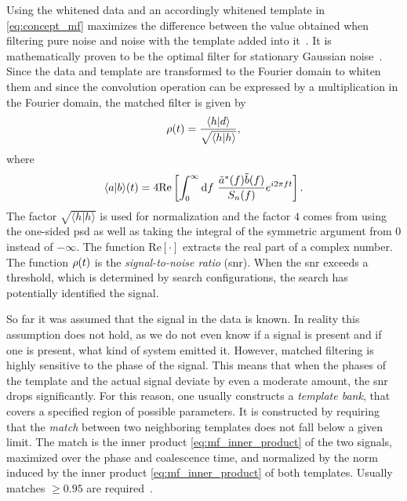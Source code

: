 Using the whitened data and an accordingly whitened template in \eqref{eq:concept_mf} maximizes the difference between the value obtained when filtering pure noise and noise with the template added into it~\cite{Maggiore:2008aaa}. It is mathematically proven to be the optimal filter for stationary Gaussian noise~\cite{Allen:2005fk}. Since the data and template are transformed to the Fourier domain to whiten them and since the convolution operation can be expressed by a multiplication in the Fourier domain, the matched filter is given by~\cite{Maggiore:2008aaa, Usman:2015kfa}%
\begin{equation}
\rho{\left( t \right)} = \frac{\langle h\vert d\rangle}{\sqrt{\langle h\vert h\rangle}},
\end{equation}
where
\begin{equation}\label{eq:mf_inner_product}
\langle a\vert b\rangle\lr{t} = 4\text{Re}\left[\int_0^\infty\diff{f}\ \frac{\tilde{a}^\ast\lr{f}\tilde{b}\lr{f}}{S_n\lr{f}} e^{i2\pi ft}\right].
\end{equation}
The factor $\sqrt{\langle h\vert h\rangle}$ is used for normalization and the factor $4$ comes from using the one-sided \acrshort{psd} as well as taking the integral of the symmetric argument from $0$ instead of $-\infty$. The function $\text{Re}\left[\cdot\right]$ extracts the real part of a complex number. The function $\rho{\left( t \right)}$ is the \emph{signal-to-noise ratio} (\acrshort{snr}). When the \acrshort{snr} exceeds a threshold, which is determined by search configurations, the search has potentially identified the signal.

So far it was assumed that the signal in the data is known. In reality this assumption does not hold, as we do not even know if a signal is present and if one is present, what kind of system emitted it. However, matched filtering is highly sensitive to the phase of the signal. This means that when the phases of the template and the actual signal deviate by even a moderate amount, the \acrshort{snr} drops significantly. For this reason, one usually constructs a \emph{template bank}, that covers a specified region of possible parameters. It is constructed by requiring that the \emph{match} between two neighboring templates does not fall below a given limit. The match is the inner product \eqref{eq:mf_inner_product} of the two signals, maximized over the phase and coalescence time, and normalized by the norm induced by the inner product \eqref{eq:mf_inner_product} of both templates. Usually matches $\geq 0.95$ are required~\cite{LIGOScientific:2021djp, Nitz:2021uxj}.

